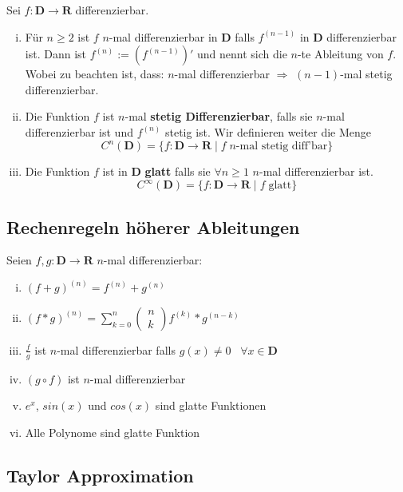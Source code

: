 \documentclass[8pt]{article}
\begin{document}
\begin{multicols*}{3}
Sei $f: \mathbf{D} \rightarrow \mathbf{R}$ differenzierbar.
\begin{enumerate}[(i)]
  \item Für $n \geq 2$ ist $f$ $n$-mal differenzierbar in $\mathbf{D}$
  falls $f^{(n-1)}$ in $\mathbf{D}$ differenzierbar ist. Dann ist $f^{(n)} := (f^{(n-1)})'$
  und nennt sich die $n$-te Ableitung von $f$. Wobei zu beachten ist, dass: $n$-mal differenzierbar $\Rightarrow$ $(n-1)$-mal stetig differenzierbar.
  \item Die Funktion $f$ ist $n$-mal \textbf{stetig Differenzierbar}, falls sie $n$-mal
  differenzierbar ist und $f^{(n)}$ stetig ist. Wir definieren weiter die Menge $$C^n(\mathbf{D}) = \{f: \mathbf{D} \rightarrow \mathbf{R} \;|\; f\;n\text{-mal stetig diff'bar}\}$$
  \item Die Funktion $f$ ist in $\mathbf{D}$ \textbf{glatt} falls sie $\forall n \geq 1$ $n$-mal differenzierbar ist.
  $$C^\infty(\mathbf{D}) = \{f: \mathbf{D} \rightarrow \mathbf{R} \;|\; f\;\text{glatt}\}$$
\end{enumerate}

\subsection{Rechenregeln höherer Ableitungen}

Seien $f, g: \mathbf{D} \rightarrow \mathbf{R}$ $n$-mal differenzierbar:
\begin{enumerate}[(i)]
  \item $(f + g)^{(n)} = f^{(n)} + g^{(n)}$
  \item $(f * g)^{(n)} = \sum_{k = 0}^{n} \begin{pmatrix}
    n\\
    k
  \end{pmatrix} f^{(k)} * g^{(n - k)}$
  \item $\frac{f}{g}$ ist $n$-mal differenzierbar falls $g(x) \neq 0 \;\;\; \forall x \in \mathbf{D}$
  \item $(g \circ f)$ ist $n$-mal differenzierbar
  \item $e^x$, $sin(x)$ und $cos(x)$ sind glatte Funktionen
  \item Alle Polynome sind glatte Funktion
\end{enumerate}

\subsection{Taylor Approximation}


\end{multicols*}
\end{document}
